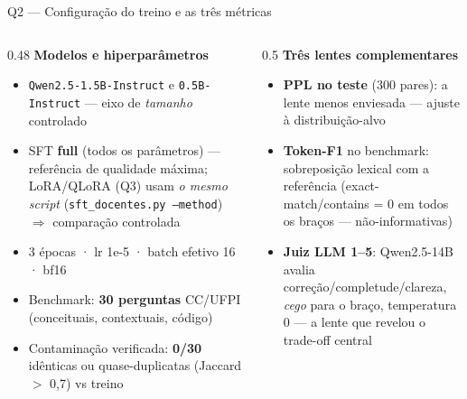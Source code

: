 \documentclass[10pt,aspectratio=169]{beamer}
\begin{document}
\begin{frame}{Q2 — Configuração do treino e as três métricas}
  \begin{columns}[T]
    \begin{column}{0.48\textwidth}
      \textbf{Modelos e hiperparâmetros}
      \begin{itemize}\small
        \item \texttt{Qwen2.5-1.5B-Instruct} e \texttt{0.5B-Instruct} — eixo de \emph{tamanho} controlado
        \item SFT \textbf{full} (todos os parâmetros) — referência de qualidade máxima; LoRA/QLoRA (Q3)
          usam \emph{o mesmo script} (\texttt{sft\_docentes.py --method}) $\Rightarrow$ comparação controlada
        \item 3 épocas · lr 1e-5 · batch efetivo 16 · bf16
        \item Benchmark: \textbf{30 perguntas} CC/UFPI (conceituais, contextuais, código)
        \item Contaminação verificada: \textbf{0/30} idênticas ou quase-duplicatas (Jaccard $>$ 0,7) vs treino
      \end{itemize}
    \end{column}
    \begin{column}{0.5\textwidth}
      \textbf{Três lentes complementares}
      \begin{itemize}\small
        \item \textbf{PPL no teste} (300 pares): a lente menos enviesada — ajuste à distribuição-alvo
        \item \textbf{Token-F1} no benchmark: sobreposição lexical com a referência (exact-match/contains = 0
          em todos os braços — não-informativas)
        \item \textbf{Juiz LLM 1–5}: Qwen2.5-14B avalia correção/completude/clareza, \emph{cego} para o braço,
          temperatura 0 — a lente que revelou o trade-off central
      \end{itemize}
    \end{column}
  \end{columns}
\end{frame}
\end{document}
